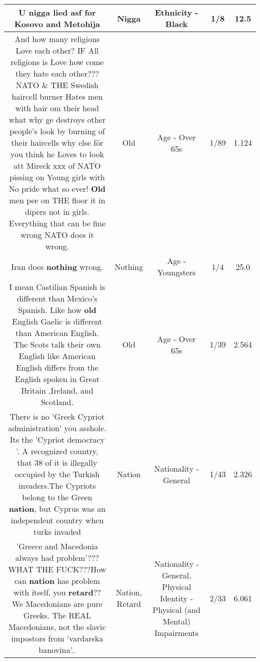 \documentclass[11pt]{article}
\newlength\mylength
\begin{document}
\begin{center}
\begin{longtable}{|C{.65\mylength}|C{.30\mylength}|C{.12\mylength}|C{.12\mylength}|C{.12\mylength}|}
  \small U \textbf{nigga} lied asf for Kosovo and Metohija\normalsize   & Nigga & Ethnicity - Black & 1/8 & 12.5 \\  \hline
  \small And how many religions Love each other? IF All religions is Love how come they hate each other??? NATO \& THE Swedish haircell burner Hates men with hair om their head what why ge destroys other people's look by burning of their haircells why else för you think he Loves to look att Mireck xxx of NATO pissing on Young girls with No pride what so ever! \textbf{Old} men pee on THE floor it in dipers not in girls. Everything that can be fine wrong NATO does it wrong.\normalsize   & Old & Age - Over 65s & 1/89 & 1.124 \\  \hline
  \small Iran does \textbf{nothing} wrong.\normalsize   & Nothing & Age - Youngsters & 1/4 & 25.0 \\  \hline
  \small I mean Castilian Spanish is different than Mexico's Spanish. Like how \textbf{old} English Gaelic is different than American English. The Scots talk their own English like American English differs from the English spoken in Great Britain ,Ireland, and Scotland.\normalsize   & Old & Age - Over 65s & 1/39 & 2.564 \\  \hline
  \small There is no 'Greek Cypriot administration' you asshole. Its the 'Cypriot democracy '. A recognized country, that 38 of it is illegally occupied by the Turkish invaders.The Cypriots belong to the Green \textbf{nation}, but Cyprus was an independent country when turks invaded\normalsize   & Nation & Nationality - General & 1/43 & 2.326 \\  \hline
  \small 'Greece and Macedonia always had problem'??? WHAT THE FUCK???How can \textbf{nation} has problem with itself, you \textbf{retard}?? We Macedonians are pure Greeks. The REAL Macedonians, not the slavic impostors from 'vardarska banovina'..\normalsize   & Nation, Retard & Nationality - General, Physical Identity - Physical (and Mental) Impairments & 2/33 & 6.061 \\  \hline

\end{longtable}
\end{center}
\end{document}
